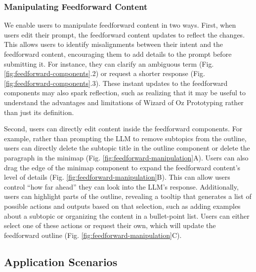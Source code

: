 

\subsubsection{Manipulating Feedforward Content}

We enable users to manipulate feedforward content in two ways.
First, when users edit their prompt, the feedforward content updates to reflect the changes.
This allows users to identify misalignments between their intent and the feedforward content, encouraging them to add details to the prompt before submitting it.
For instance, they can clarify an ambiguous term (Fig. \ref{fig:feedforward-components}.2) or request a shorter response (Fig. \ref{fig:feedforward-components}.3).
These instant updates to the feedforward components may also spark reflection, such as realizing that it may be useful to understand the advantages and limitations of Wizard of Oz Prototyping rather than just its definition.


Second, users can directly edit content inside the feedforward components. For example, rather than prompting the LLM to remove subtopics from the outline, users can directly delete the subtopic title in the outline component or delete the paragraph in the minimap (Fig. \ref{fig:feedforward-manipulation}A). Users can also drag the edge of the minimap component to expand the feedforward content's level of details (Fig. \ref{fig:feedforward-manipulation}B). This can allow users control ``how far ahead'' they can look into the LLM's response. Additionally, users can highlight parts of the outline, revealing a tooltip that generates a list of possible actions and outputs based on that selection, such as adding examples about a subtopic or organizing the content in a bullet-point list. Users can either select one of these actions or request their own, which will update the feedforward outline (Fig. \ref{fig:feedforward-manipulation}C).


\subsection{Application Scenarios}

